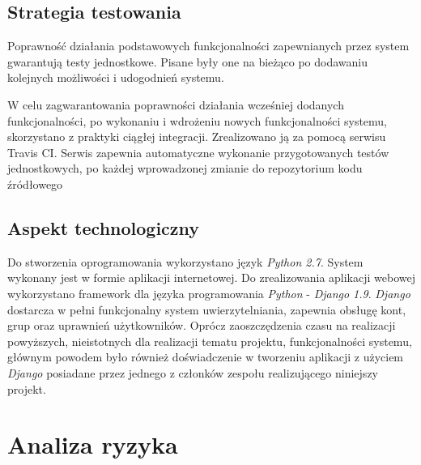 \documentclass[pdflatex,11pt]{../aghdoc_version2}
\newlength\tindent
\renewcommand{\indent}{\hspace*{\tindent}}
\begin{document}
\section{Strategia testowania}
Poprawność działania podstawowych funkcjonalności zapewnianych przez system
gwarantują testy jednostkowe. Pisane były one na bieżąco po dodawaniu kolejnych
możliwości i udogodnień systemu.

\indent W celu zagwarantowania poprawności działania wcześniej dodanych funkcjonalności, po
wykonaniu i wdrożeniu nowych funkcjonalności systemu, skorzystano z praktyki ciągłej
integracji. Zrealizowano ją za pomocą serwisu Travis CI. Serwis zapewnia automatyczne
wykonanie przygotowanych testów jednostkowych, po każdej wprowadzonej zmianie do
repozytorium kodu źródłowego
\section{Aspekt technologiczny}
\label{sec:apekt_technologiczny}
Do stworzenia oprogramowania wykorzystano język \textit{Python 2.7}. System wykonany jest w
formie aplikacji internetowej. Do zrealizowania aplikacji webowej wykorzystano framework
dla języka programowania \textit{Python} - \textit{Django 1.9}. \textit{Django} dostarcza w pełni funkcjonalny
system uwierzytelniania, zapewnia obsługę kont, grup oraz uprawnień użytkowników.
Oprócz zaoszczędzenia czasu na realizacji powyższych, nieistotnych dla realizacji tematu
projektu, funkcjonalności systemu, głównym powodem było również doświadczenie w
tworzeniu aplikacji z użyciem \textit{Django} posiadane przez jednego z członków zespołu
realizującego niniejszy projekt.

\chapter{Analiza ryzyka}
\end{document}
